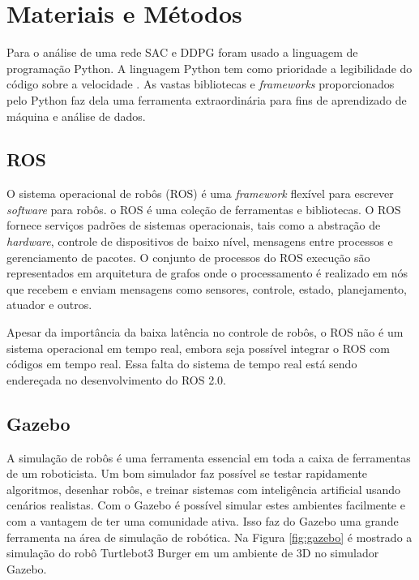\chapter{Materiais e Métodos}

Para o análise de uma rede SAC e DDPG foram usado a linguagem de programação Python.
A linguagem Python tem como prioridade a legibilidade do código sobre a velocidade \cite{ascher1999learning}. 
As vastas bibliotecas e \textit{frameworks} proporcionados pelo Python faz dela uma ferramenta extraordinária para fins de aprendizado de máquina e análise de dados.

\section{ROS}

O sistema operacional de robôs (ROS) é uma \textit{framework} flexível para escrever \textit{software} para robôs.
o ROS \cite{pyo2015ros} é uma coleção de ferramentas e bibliotecas.
O ROS fornece serviços padrões de sistemas operacionais, tais como a abstração de \textit{hardware}, controle de dispositivos de baixo nível, mensagens entre processos e gerenciamento de pacotes.
O conjunto de processos do ROS execução são representados em arquitetura de grafos onde o processamento é realizado em nós que recebem e enviam mensagens como sensores, controle, estado, planejamento, atuador e outros.

Apesar da importância da baixa latência no controle de robôs, o ROS não é um sistema operacional em tempo real, embora seja possível integrar o ROS com códigos em tempo real. Essa falta do sistema de tempo real está sendo endereçada no desenvolvimento do ROS 2.0.

\section{Gazebo}

A simulação de robôs é uma ferramenta essencial em toda a caixa de ferramentas de um roboticista.
Um bom simulador faz possível se testar rapidamente algoritmos, desenhar robôs, e treinar sistemas com inteligência artificial usando cenários realistas.
Com o Gazebo \cite{fairchild2016ros} é possível simular estes ambientes facilmente e com a vantagem de ter uma comunidade ativa. Isso faz do Gazebo uma grande ferramenta na área de simulação de robótica. Na Figura \ref{fig:gazebo} é mostrado a simulação do robô Turtlebot3 Burger em um ambiente de 3D no simulador Gazebo.

